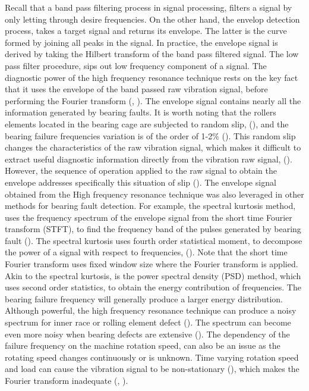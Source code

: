 \documentclass[../Main/thesis.tex]{subfiles}
\begin{document}
 \justify
  Recall that a band pass filtering process in signal processing, filters a signal by only letting through desire frequencies. On the other hand, the envelop detection process, takes a target signal and returns its envelope. The latter is the curve formed by joining all peaks in the signal. In practice, the envelope signal is derived by taking the Hilbert transform of the band pass filtered signal. The low pass filter procedure, sips out low frequency component of a signal.
\justify
The diagnostic power of the high frequency resonance technique rests on the key fact that it uses the envelope of the band passed raw vibration signal, before performing the Fourier transform (\cite{mcfadden1984a}, \cite{randal2010}). The envelope signal contains nearly all the information generated by bearing faults. It is worth noting that the rollers elements located in the bearing cage are subjected to random slip, (\cite{mcfadden1984a}), and the bearing failure frequencies variation is of the order of 1-2$\%$ (\cite{randal2010}). This random slip changes the characteristics of the raw vibration signal, which makes it difficult to extract useful diagnostic information directly from the vibration raw signal, (\cite{randal2010}). However, the sequence of operation applied to the raw signal to obtain the envelope addresses specifically this situation of slip  (\cite{randal2010}). 
\justify
The envelope signal obtained from the High frequency resonance technique was also leveraged in other methods for bearing fault detection. For example, the spectral kurtosis method, uses the frequency spectrum of the envelope signal from the short time Fourier transform (STFT), to find the frequency band of the pulses generated by bearing fault (\cite{randal2010}). The spectral kurtosis uses fourth order statistical moment, to decompose the power of a signal with respect to frequencies, (\cite{randal2010}). Note that the short time Fourier transform uses fixed window size where the Fourier transform is applied. Akin to the spectral kurtosis, is the power spectral density (PSD) method, which uses second order statistics, to obtain the energy contribution of frequencies. The bearing failure frequency will generally produce a larger energy distribution.
\justify
 Although powerful, the high frequency resonance technique can produce a noisy spectrum for inner race or rolling element defect (\cite{mcfadden1984a}). The spectrum can become even more noisy when bearing defects are extensive (\cite{mcfadden1984a}). The dependency of the failure frequency on the machine rotation speed, can also be an issue as the rotating speed changes continuously or is unknown. Time varying rotation speed and load can cause the vibration signal to be non-stationary (\cite{zhao2014}), which makes the Fourier transform inadequate (\cite{huang98}, \cite{huang08}).
\end{document}
